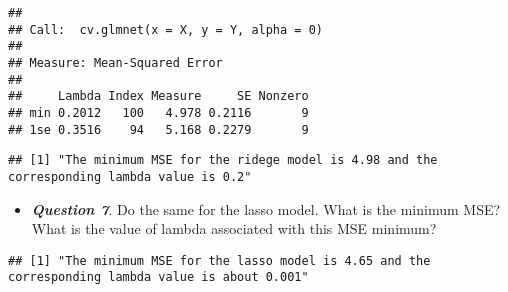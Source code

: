\documentclass[
]{article}
\newenvironment{Shaded}{\begin{snugshade}}{\end{snugshade}}
\newcommand{\DecValTok}[1]{\textcolor[rgb]{0.00,0.00,0.81}{#1}}
\newcommand{\FunctionTok}[1]{\textcolor[rgb]{0.00,0.00,0.00}{#1}}
\newcommand{\NormalTok}[1]{#1}
\newcommand{\SpecialCharTok}[1]{\textcolor[rgb]{0.00,0.00,0.00}{#1}}
\newcommand{\StringTok}[1]{\textcolor[rgb]{0.31,0.60,0.02}{#1}}
\providecommand{\tightlist}{%
  \setlength{\itemsep}{0pt}\setlength{\parskip}{0pt}}
\begin{document}
\begin{verbatim}
## 
## Call:  cv.glmnet(x = X, y = Y, alpha = 0) 
## 
## Measure: Mean-Squared Error 
## 
##     Lambda Index Measure     SE Nonzero
## min 0.2012   100   4.978 0.2116       9
## 1se 0.3516    94   5.168 0.2279       9
\end{verbatim}

\begin{Shaded}
\end{Shaded}

\begin{verbatim}
## [1] "The minimum MSE for the ridege model is 4.98 and the corresponding lambda value is 0.2"
\end{verbatim}

\begin{itemize}
\tightlist
\item
  \textbf{\emph{Question 7}}. Do the same for the lasso model. What is
  the minimum MSE? What is the value of lambda associated with this MSE
  minimum?
\end{itemize}

\begin{Shaded}
\end{Shaded}

\begin{verbatim}
## [1] "The minimum MSE for the lasso model is 4.65 and the corresponding lambda value is about 0.001"
\end{verbatim}
\end{document}

